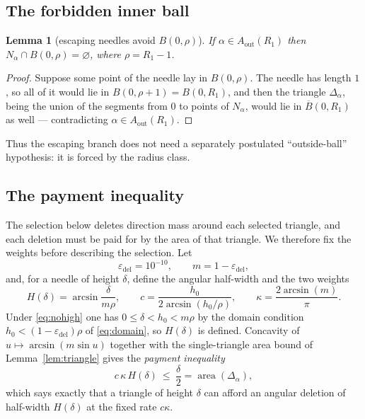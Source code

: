 \documentclass[11pt]{article}
\theoremstyle{plain}
\newtheorem{lemma}[theorem]{Lemma}
\theoremstyle{definition}
\theoremstyle{remark}
\newcommand{\Aout}{A_{\mathrm{out}}}
\newcommand{\epsdel}{\varepsilon_{\mathrm{del}}}
\begin{document}
\subsection{The forbidden inner ball}

\begin{lemma}[escaping needles avoid $B(0,\rho)$]\label{lem:outside}
If $\alpha\in\Aout(R_{1})$ then $N_{\alpha}\cap B(0,\rho)=\varnothing$, where
$\rho=R_{1}-1$.
\end{lemma}

\begin{proof}
Suppose some point of the needle lay in $B(0,\rho)$. The needle has length $1$,
so all of it would lie in $B(0,\rho+1)=B(0,R_{1})$, and then the triangle
$\Delta_{\alpha}$, being the union of the segments from $0$ to points of
$N_{\alpha}$, would lie in $\overline B(0,R_{1})$ as well --- contradicting
$\alpha\in\Aout(R_{1})$.
\end{proof}

Thus the escaping branch does not need a separately postulated
``outside-ball'' hypothesis: it is forced by the radius class.

\subsection{The payment inequality}

The selection below deletes direction mass around each selected triangle, and
each deletion must be paid for by the area of that triangle. We therefore fix
the weights before describing the selection. Let
\[
  \epsdel=10^{-10},\qquad m=1-\epsdel,
\]
and, for a needle of height $\delta$, define the angular half-width and the two
weights
\begin{equation}\label{eq:weights}
  H(\delta)=\arcsin\frac{\delta}{m\rho},
  \qquad
  c=\frac{h_{0}}{2\arcsin(h_{0}/\rho)},
  \qquad
  \kappa=\frac{2\arcsin(m)}{\pi} .
\end{equation}
Under \eqref{eq:nohigh} one has $0\le\delta<h_{0}<m\rho$ by the domain condition
$h_{0}<(1-\epsdel)\rho$ of \eqref{eq:domain}, so $H(\delta)$ is defined.
Concavity of $u\mapsto\arcsin(m\sin u)$ together with the single-triangle area
bound of Lemma~\ref{lem:triangle} gives the \emph{payment inequality}
\begin{equation}\label{eq:payment}
  c\,\kappa\,H(\delta)\ \le\ \frac{\delta}{2}
  =\operatorname{area}(\Delta_{\alpha}),
\end{equation}
which says exactly that a triangle of height $\delta$ can afford an angular
deletion of half-width $H(\delta)$ at the fixed rate $c\kappa$.
\end{document}
